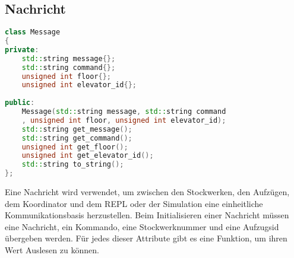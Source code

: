 \subsection{Nachricht}

\begin{lstlisting}[language=C++]
class Message
{
private:
    std::string message{};
    std::string command{};
    unsigned int floor{};
    unsigned int elevator_id{};
    
public:
    Message(std::string message, std::string command
    , unsigned int floor, unsigned int elevator_id);
    std::string get_message();
    std::string get_command();
    unsigned int get_floor();
    unsigned int get_elevator_id();
    std::string to_string();
};
\end{lstlisting}

\vspace{5mm}

Eine Nachricht wird verwendet, um zwischen den Stockwerken, den Aufzügen, dem Koordinator und dem REPL oder der Simulation eine einheitliche Kommunikationsbasis herzustellen. Beim Initialisieren einer Nachricht müssen eine Nachricht, ein Kommando, eine Stockwerknummer und eine Aufzugsid übergeben werden. Für jedes dieser Attribute gibt es eine Funktion, um ihren Wert Auslesen zu können.